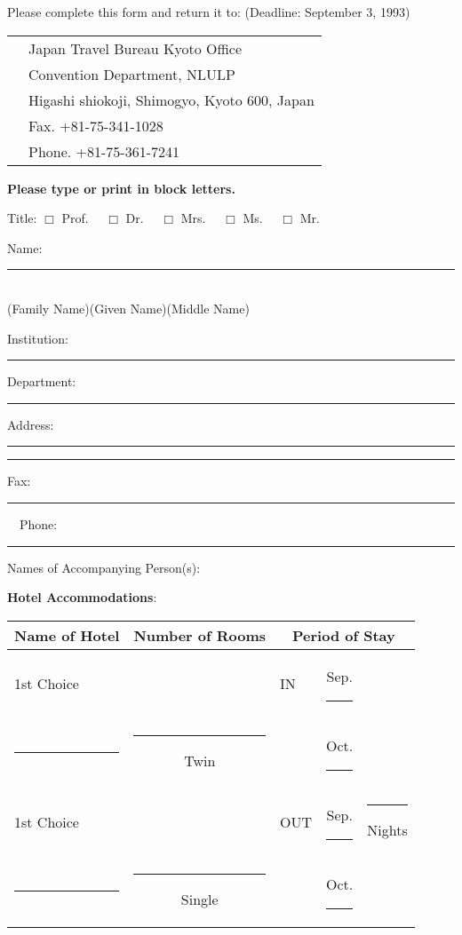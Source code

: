 \vspace{-3mm}
Please complete this form and return it to: (Deadline: September 3, 1993)

\begin{tabular}{ll}
\hspace*{10mm}	& Japan Travel Bureau Kyoto Office\\
		& Convention Department, NLULP\\
		& Higashi shiokoji, Shimogyo, Kyoto 600, Japan\\
		& Fax. +81-75-341-1028\\
		& Phone. +81-75-361-7241
\end{tabular}

{\bf Please type or print in block letters.}

Title: $\Box$ Prof. \ \ $\Box$ Dr. \ \ $\Box$ Mrs. \ \ $\Box$ Ms. \ \ $\Box$ Mr.

Name: \rule[-1mm]{143mm}{.1mm}\\
\hspace*{15mm}(Family Name)\hspace{30mm}(Given
Name)\hspace{30mm}(Middle Name)

Institution: \rule[-1mm]{135mm}{.1mm}

Department: \rule[-1mm]{133mm}{.1mm}

Address: \rule[-1mm]{140mm}{.1mm}

\hspace*{15mm} \rule[-1mm]{140mm}{.1mm}

Fax: \rule[-1mm]{66mm}{.1mm}\ \ Phone: \rule[-1mm]{66mm}{.1mm}

Names of Accompanying Person(s): \hrulefill

{\bf Hotel Accommodations}:

\begin{tabular}{|l|c|lc|c|}\hline
Name of Hotel & Number of Rooms & \multicolumn{3}{|c|}{Period of
Stay}\\ \hline
1st Choice    & & IN & Sep. \rule[-1mm]{15mm}{.1mm} & \\
\hspace*{15mm}\rule{40mm}{.1mm} & \rule{15mm}{.1mm} Twin 
	& & Oct. \rule[-1mm]{15mm}{.1mm} & \\
1st Choice    & & OUT & Sep. \rule[-1mm]{15mm}{.1mm} &
\rule{10mm}{.1mm} Nights\\
\hspace*{15mm}\rule{40mm}{.1mm} & \rule{15mm}{.1mm} Single
	& & Oct. \rule[-1mm]{15mm}{.1mm} & \\ \hline
\end{tabular}

